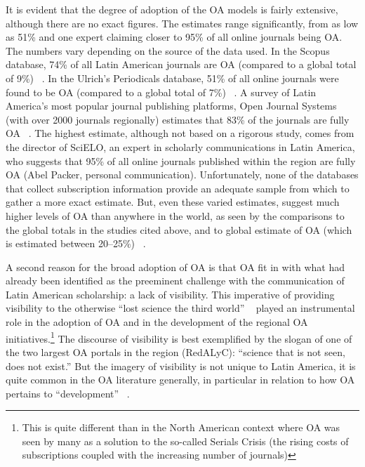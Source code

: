 It is evident that the degree of adoption of the OA models is fairly extensive, although there are no exact figures. The estimates range significantly, from as low as 51\% and one expert claiming closer to 95\% of all online journals being OA. The numbers vary depending on the source of the data used. In the Scopus database, 74\% of all Latin American journals are OA (compared to a global total of 9\%) ~\citep{Miguel2011}. In the Ulrich's Periodicals database, 51\% of all online journals were found to be OA (compared to a global total of 7\%) ~\citep{Haider:2005kx}. A survey of Latin America's most popular journal publishing platforms, Open Journal Systems (with over 2000 journals regionally) estimates that 83\% of the journals are fully OA ~\citep{Edgar2010}. The highest estimate, although not based on a rigorous study, comes from the director of SciELO, an expert in scholarly communications in Latin America, who suggests that 95\% of all online journals published within the region are fully OA (Abel Packer, personal communication). Unfortunately, none of the databases that collect subscription information provide an adequate sample from which to gather a more exact estimate. But, even these varied estimates, suggest much higher levels of OA than anywhere in the world, as seen by the comparisons to the global totals in the studies cited above, and to global estimate of OA (which is estimated between 20--25\%) ~\citep{Laakso2011,Laakso2012}.

A second reason for the broad adoption of OA is that OA fit in with what had already been identified as the preeminent challenge with the communication of Latin American scholarship: a lack of visibility. This imperative of providing visibility to the otherwise ``lost science the third world'' ~\citep{Gibbs1995} played an instrumental role in the adoption of OA and in the development of the regional OA initiatives.\footnote{This is quite different than in the North American context where OA was seen by many as a solution to the so-called Serials Crisis (the rising costs of subscriptions coupled with the increasing number of journals)} The discourse of visibility is best exemplified by the slogan of one of the two largest OA portals in the region (RedALyC): ``science that is not seen, does not exist.'' But the imagery of visibility is not unique to Latin America, it is quite common in the OA literature generally, in particular in relation to how OA pertains to ``development'' ~\citep{haider2007}.

